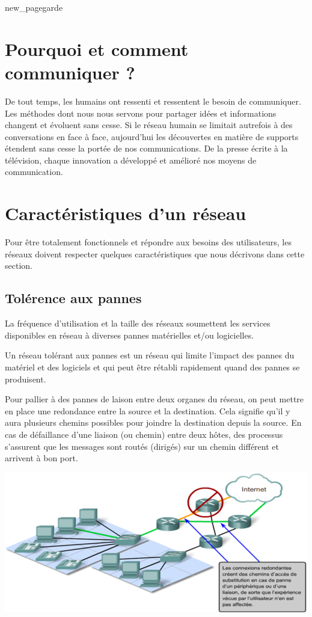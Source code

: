 \documentclass[10pt,fleqn]{article} %
\begin{document}
{new_pagegarde}

\section{Pourquoi et comment communiquer ?}
De tout temps, les humains ont ressenti et ressentent le besoin de communiquer.
Les méthodes dont nous nous servons pour partager idées et informations changent et évoluent sans cesse. Si le réseau humain se limitait autrefois à des conversations en face à face, aujourd'hui les découvertes en matière de supports étendent sans cesse la portée de nos communications. De la presse écrite à la télévision, chaque innovation a développé et amélioré nos moyens de communication.

\section{Caractéristiques d'un réseau}
\label{sec:caracteristiques}
Pour être totalement fonctionnels et répondre aux besoins des utilisateurs, les réseaux doivent respecter quelques caractéristiques que nous décrivons dans cette section.


\subsection{Tolérence aux pannes}
La fréquence d'utilisation et la taille des réseaux soumettent les services disponibles en réseau à diverses pannes matérielles et/ou logicielles.
\begin{defi}
  Un réseau tolérant aux pannes est un réseau qui limite l'impact des pannes du matériel et des logiciels et qui peut être rétabli rapidement quand des pannes se produisent.
\end{defi}
\begin{exemple}
  Pour pallier à des pannes de laison entre deux organes du réseau, on peut mettre en place une redondance entre la source et la destination. Cela signifie qu'il y aura plusieurs chemins possibles pour joindre la destination depuis la source.
  En cas de défaillance d'une liaison (ou chemin) entre deux hôtes, des processus s'assurent que les messages sont routés (dirigés) sur un chemin différent et arrivent à bon port.
  \begin{center}
    \includegraphics[width=.7\textwidth]{img/reseau_redondances}
  \end{center}
\end{exemple}
\end{document}
